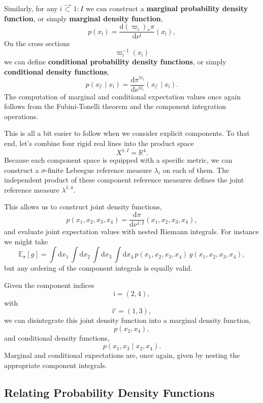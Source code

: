 \documentclass[
  letterpaper,
  DIV=11,
  numbers=noendperiod]{scrartcl}
\begin{document}
Similarly, for any \(\mathsf{i} \, \vec{\subset} \, 1:I\) we can
construct a \textbf{marginal probability density function}, or simply
\textbf{marginal density function}, \[
p( x_{ \mathsf{i} } )
=
\frac{
  \mathrm{d} ( \varpi_{\mathsf{i}} )_{*} \pi
}{
  \mathrm{d} \nu^{ \mathsf{i} }
} ( x_{ \mathsf{i} } ),
\] On the cross sections \[
\varpi_{\mathsf{i}}^{-1}( x_{\mathsf{i}} )
\] we can define \textbf{conditional probability density functions}, or
simply \textbf{conditional density functions}, \[
p( x_{\mathsf{i}^{c}} \mid x_{ \mathsf{i} } )
=
\frac{
  \mathrm{d} \pi^{\varpi_{\mathsf{i}}}
}{
  \mathrm{d} \nu^{\varpi_{\mathsf{i}}}
} ( x_{\mathsf{i}^{c}} \mid x_{ \mathsf{i} } ).
\] The computation of marginal and conditional expectation values once
again follows from the Fubini-Tonelli theorem and the component
integration operations.

This is all a bit easier to follow when we consider explicit components.
To that end, let's combine four rigid real lines into the product space
\[
X^{1:I} = \mathbb{R}^{4}.
\] Because each component space is equipped with a specific metric, we
can construct a \(\sigma\)-finite Lebesgue reference measure
\(\lambda_{i}\) on each of them. The independent product of these
component reference measures defines the joint reference measure
\(\lambda^{1:4}\).

This allows us to construct joint density functions, \[
p( x_{1}, x_{2}, x_{3}, x_{4} )
=
\frac{
  \mathrm{d} \pi
}{
  \mathrm{d} \nu^{1:I}
} ( x_{1}, x_{2}, x_{3}, x_{4} ),
\] and evaluate joint expectation values with nested Riemann integrals.
For instance we might take \[
\mathbb{E}_{ \pi }[ g ]
=
\int \mathrm{d} x_{1} \, \int \mathrm{d} x_{2} \,
\int \mathrm{d} x_{3} \, \int \mathrm{d} x_{4} \,
  p( x_{1}, x_{2}, x_{3}, x_{4} ) \,
  g( x_{1}, x_{2}, x_{3}, x_{4} ),
\] but any ordering of the component integrals is equally valid.

Given the component indices \[
\mathsf{i} = ( 2, 4 ),
\] with \[
\mathsf{i}^{c} = ( 1, 3 ),
\] we can disintegrate this joint density function into a marginal
density function, \[
p( x_{2}, x_{4} ),
\] and conditional density functions, \[
p( x_{1}, x_{3} \mid x_{2}, x_{4} ).
\] Marginal and conditional expectations are, once again, given by
nesting the appropriate component integrals.

\subsection{Relating Probability Density
Functions}\label{relating-probability-density-functions}
\end{document}
